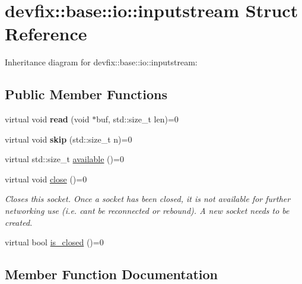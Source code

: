 \hypertarget{structdevfix_1_1base_1_1io_1_1inputstream}{}\section{devfix\+:\+:base\+:\+:io\+:\+:inputstream Struct Reference}
\label{structdevfix_1_1base_1_1io_1_1inputstream}


Inheritance diagram for devfix\+:\+:base\+:\+:io\+:\+:inputstream\+:
\subsection*{Public Member Functions}
\begin{DoxyCompactItemize}
\item 
\mbox{\label{structdevfix_1_1base_1_1io_1_1inputstream_a17e1a21881ae263650ebdaafaee2e71a}} 
virtual void {\bfseries read} (void $\ast$buf, std\+::size\+\_\+t len)=0
\item 
\mbox{\label{structdevfix_1_1base_1_1io_1_1inputstream_a1868a733fd646b29daae6874e07e4e03}} 
virtual void {\bfseries skip} (std\+::size\+\_\+t n)=0
\item 
virtual std\+::size\+\_\+t \hyperlink{structdevfix_1_1base_1_1io_1_1inputstream_ace04813af676b6c81fa452eb4d81a796}{available} ()=0
\item 
\mbox{\label{structdevfix_1_1base_1_1io_1_1inputstream_a1188eff97757eb9625be91dfeca17af7}} 
virtual void \hyperlink{structdevfix_1_1base_1_1io_1_1inputstream_a1188eff97757eb9625be91dfeca17af7}{close} ()=0
\begin{DoxyCompactList}\small\item\em Closes this socket. Once a socket has been closed, it is not available for further networking use (i.\+e. can\textquotesingle{}t be reconnected or rebound). A new socket needs to be created. \end{DoxyCompactList}\item 
virtual bool \hyperlink{structdevfix_1_1base_1_1io_1_1inputstream_a9da6b400424ff476ed0479193c219fa9}{is\+\_\+closed} ()=0
\end{DoxyCompactItemize}


\subsection{Member Function Documentation}
\mbox{\label{structdevfix_1_1base_1_1io_1_1inputstream_ace04813af676b6c81fa452eb4d81a796}} 
